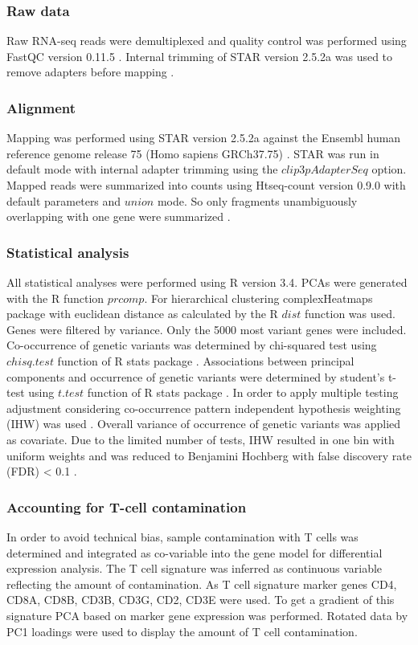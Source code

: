\subsubsection{Raw data}
Raw RNA-seq reads were demultiplexed and quality control was performed using FastQC version 0.11.5 \citep{Andrews}. Internal trimming of STAR version 2.5.2a \citep{Dobin2015} was used to remove adapters before mapping \citep{Dobin2015}.

\subsubsection{Alignment}
Mapping was performed using STAR version 2.5.2a \citep{Dobin2015} against the Ensembl human reference genome release 75 (Homo sapiens GRCh37.75) \citep{Flicek2014}. STAR was run in default mode with internal adapter trimming using the $clip3pAdapterSeq$ option. Mapped reads were summarized into counts using Htseq-count version 0.9.0 \citep{Anders2010} with default parameters and $union$ mode. So only fragments unambiguously overlapping with one gene were summarized \citep{Anders2010}.       

\subsubsection{Statistical analysis}
All statistical analyses were performed using R version 3.4. PCAs were generated with the R function $prcomp$. For hierarchical clustering complexHeatmaps package \citep{Gu2016} with euclidean distance as calculated by the R $dist$ function was used. Genes were filtered by variance. Only the 5000 most variant genes were included. Co-occurrence of genetic variants was determined by chi-squared test using $chisq.test$ function of R stats package \citep{RCoreTeam2017}. Associations between principal components and occurrence of genetic variants were determined by student’s t-test using $t.test$ function of R stats package \citep{RCoreTeam2017}. In order to apply multiple testing adjustment considering co-occurrence pattern independent hypothesis weighting (IHW) was used \citep{Ignatiadis2016}. Overall variance of occurrence of genetic variants was applied as covariate. Due to the limited number of tests, IHW resulted in one bin with uniform weights and was reduced to Benjamini Hochberg with false discovery rate (FDR) < 0.1 \citep{Benjamini}.

\subsubsection{Accounting for T-cell contamination}
In order to avoid technical bias, sample contamination with T cells was determined and integrated as co-variable into the gene model for differential expression analysis. The T cell signature was inferred as continuous variable reflecting the amount of contamination. As T cell signature marker genes CD4, CD8A, CD8B, CD3B, CD3G, CD2, CD3E were used. To get a gradient of this signature PCA based on marker gene expression was performed. Rotated data by PC1 loadings were used to display the amount of T cell contamination.  

